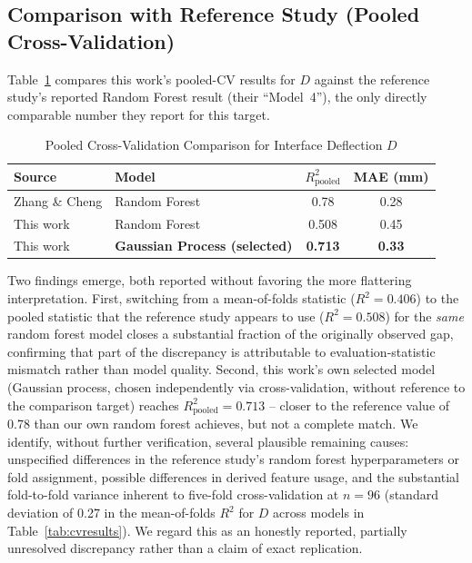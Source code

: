 \documentclass[conference]{IEEEtran}
\begin{document}
\subsection{Comparison with Reference Study (Pooled Cross-Validation)}
Table~\ref{tab:comparison} compares this work's pooled-CV results for $D$ against the reference study's reported Random Forest result (their ``Model~4''), the only directly comparable number they report for this target.

\begin{table}[!t]
\caption{Pooled Cross-Validation Comparison for Interface Deflection $D$}
\label{tab:comparison}
\centering
\begin{tabular}{@{}llcc@{}}
\toprule
\textbf{Source} & \textbf{Model} & $R^2_{\text{pooled}}$ & \textbf{MAE (mm)} \\
\midrule
Zhang \& Cheng \cite{zhang_cheng2022} & Random Forest & 0.78 & 0.28 \\
This work & Random Forest & 0.508 & 0.45 \\
This work & \textbf{Gaussian Process (selected)} & \textbf{0.713} & \textbf{0.33} \\
\bottomrule
\end{tabular}
\end{table}

Two findings emerge, both reported without favoring the more flattering interpretation. First, switching from a mean-of-folds statistic ($R^2=0.406$) to the pooled statistic that the reference study appears to use ($R^2=0.508$) for the \emph{same} random forest model closes a substantial fraction of the originally observed gap, confirming that part of the discrepancy is attributable to evaluation-statistic mismatch rather than model quality. Second, this work's own selected model (Gaussian process, chosen independently via cross-validation, without reference to the comparison target) reaches $R^2_{\text{pooled}}=0.713$ -- closer to the reference value of 0.78 than our own random forest achieves, but not a complete match. We identify, without further verification, several plausible remaining causes: unspecified differences in the reference study's random forest hyperparameters or fold assignment, possible differences in derived feature usage, and the substantial fold-to-fold variance inherent to five-fold cross-validation at $n=96$ (standard deviation of 0.27 in the mean-of-folds $R^2$ for $D$ across models in Table~\ref{tab:cvresults}). We regard this as an honestly reported, partially unresolved discrepancy rather than a claim of exact replication.
\end{document}

